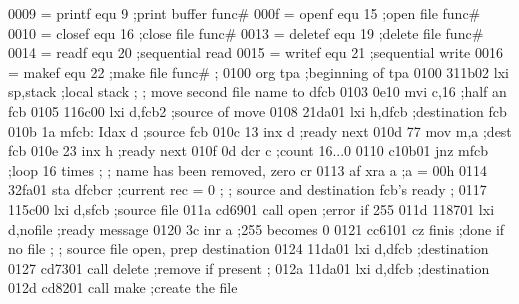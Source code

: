      0009 =                      printf   equ 9          ;print buffer func#
     000f =                      openf    equ 15         ;open file func#
     0010 =                      closef   equ 16         ;close file func#
     0013 =                      deletef  equ 19         ;delete file func#
     0014 =                      readf    equ 20         ;sequential read
     0015 =                      writef   equ 21         ;sequential write
     0016 =                      makef    equ 22         ;make file func#
                                 ;
     0100                                 org tpa        ;beginning of tpa
     0100 311b02                          lxi sp,stack   ;local stack
                                 ;
                                 ;        move second file name to dfcb
     0103 0e10                            mvi c,16       ;half an fcb
     0105 116c00                          lxi d,fcb2     ;source of move
     0108 21da01                          lxi h,dfcb     ;destination fcb
     010b 1a                     mfcb:    Idax d         ;source fcb
     010c 13                              inx  d         ;ready next
     010d 77                              mov  m,a       ;dest fcb
     010e 23                              inx  h         ;ready next
     010f 0d                              dcr  c         ;count 16...0
     0110 c10b01                          jnz  mfcb      ;loop 16 times
                                 ;   
                                 ;        name has been removed, zero cr
     0113 af                              xra  a         ;a = 00h
     0114 32fa01                          sta  dfcbcr    ;current rec = 0
                                 ;
                                 ;        source and destination fcb's ready
                                 ;
     0117 115c00                          lxi  d,sfcb    ;source file
     011a cd6901                          call open      ;error if 255
     011d 118701                          lxi  d,nofile  ;ready message
     0120 3c                              inr  a         ;255 becomes 0
     0121 cc6101                          cz   finis     ;done if no file
                                 ;      
                                 ;        source file open, prep destination
     0124 11da01                          lxi  d,dfcb    ;destination
     0127 cd7301                          call delete    ;remove if present
                                 ;
     012a 11da01                          lxi  d,dfcb    ;destination
     012d cd8201                          call make      ;create the file
